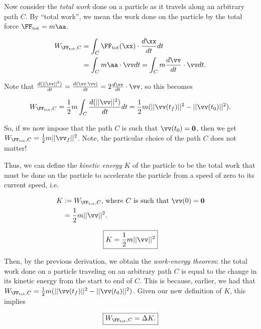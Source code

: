 \documentclass{article}
\begin{document}
Now consider the \textit{total work} done on a particle as it travels along an arbitrary path $C$. By ``total work'', we mean the work done on the particle by the total force $\FF_{\text{tot}} = m \aa$.

\begin{align*}
    W_{\FF_{\text{tot}}, C} &= \int_C \FF_{\text{tot}}(\xx) \cdot \frac{d \xx}{d t} d t \\
    &= \int_C m \aa \cdot \vv d t = \int_C m \frac{d \vv}{d t} \cdot \vv d t.
\end{align*}

Note that $\frac{d(||\vv||^2)}{dt} = \frac{d(\vv \cdot \vv)}{dt} = 2 \frac{d\vv}{dt} \cdot \vv$, so this becomes

\begin{align*}
    W_{\FF_{\text{tot}}, C} = \frac{1}{2} m \int_C \frac{d(||\vv||^2)}{dt} dt = \frac{1}{2} m (||\vv(t_f)||^2 - ||\vv(t_0)||^2).
\end{align*}

So, if we now impose that the path $C$ is such that $\vv(t_0) = \mathbf{0}$, then we get $W_{\FF_{\text{tot}}, C} = \frac{1}{2}m||\vv_f||^2$. Note, the particular choice of the path $C$ does not matter!

Thus, we can define the \textit{kinetic energy} $K$ of the particle to be the total work that must be done on the particle to accelerate the particle from a speed of zero to its current speed, i.e.

\begin{align*}
    K &:= W_{\FF_{\text{tot}}, C} \text{, where $C$ is such that $\vv(0) = \mathbf{0}$} \\
       &= \frac{1}{2}m||\vv||^2.
\end{align*}

\begin{align*}
    \boxed
    {
        K = \frac{1}{2}m||\vv||^2
    }
\end{align*}

Then, by the previous derivation, we obtain the \textit{work-energy theorem}: the total work done on a particle traveling on an arbitrary path $C$ is equal to the change in its kinetic energy from the start to end of $C$. This is because, earlier, we had that $W_{\FF_{\text{tot}}, C} = \frac{1}{2} m (||\vv(t_f)||^2 - ||\vv(t_0)||^2)$. Given our new definition of $K$, this implies

\begin{align*}
    \boxed
    {
        W_{\FF_{\text{tot}}, C} = \Delta K.
    }
\end{align*}
\end{document}
